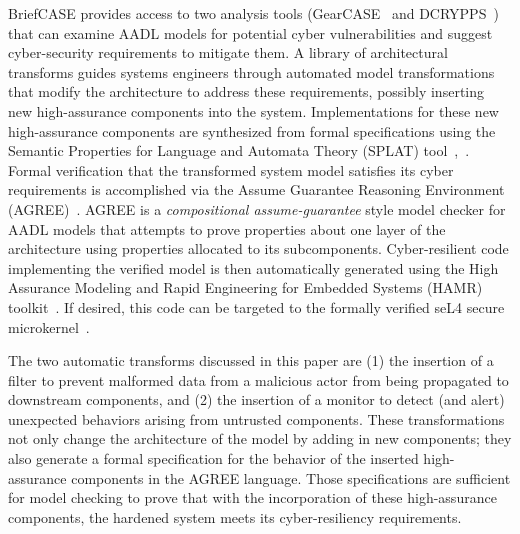 BriefCASE provides access to two analysis tools (GearCASE~\cite{gearcase2020} and DCRYPPS~\cite{dcrypps2019}) that can examine AADL models for potential cyber vulnerabilities and suggest cyber-security requirements to mitigate them.
A library of architectural transforms guides systems engineers through automated model transformations that modify the architecture to address these requirements, possibly inserting new high-assurance components into the system. 
Implementations for these new high-assurance components are synthesized from formal specifications using the Semantic Properties for Language and Automata Theory (SPLAT) tool~\cite{slind-hcss2020},~\cite{formal-filter-synth-langsec}.
Formal verification that the transformed system model satisfies its cyber requirements is accomplished via the Assume Guarantee Reasoning Environment (AGREE)~\cite{agree2013}.
AGREE is a {\em compositional assume-guarantee} style model checker for AADL models that attempts to prove properties about one layer of the architecture using
properties allocated to its subcomponents.
Cyber-resilient code implementing the verified model is then automatically generated using the High Assurance Modeling and Rapid Engineering for Embedded Systems (HAMR) toolkit~\cite{hamr}.  If desired, this code can be targeted to the formally verified seL4 secure microkernel~\cite{sel4-2009}.


The two automatic transforms discussed in this paper are (1) the insertion of a filter to prevent malformed data from a malicious actor from being propagated to downstream components, and (2) the insertion of a monitor to detect (and alert) unexpected behaviors arising from untrusted components. These transformations not only change the architecture of the model by adding in new components; they also generate a formal specification for the behavior of the inserted high-assurance components in the AGREE language. Those specifications are sufficient for model checking to prove that with the incorporation of these high-assurance components, the hardened system meets its cyber-resiliency requirements.


